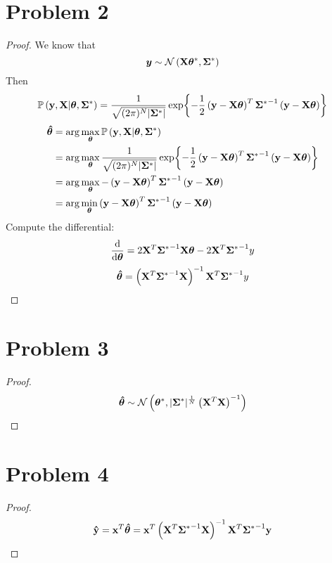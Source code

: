 \documentclass{article}
\begin{document}
\section*{Problem 2}
    \begin{proof}
    We know that $$\vb*{y}\sim \mathcal{N}\left(\vb{X}\bm{\theta}^*, \bm{\Sigma}^*\right)$$ Then
    $$ \mathbb{P}\left(\vb{y},\vb{X}|\bm{\theta},\bm{\Sigma}^*\right)
    =\frac{1}{\sqrt{(2\pi)^N |\bm{\Sigma}^*|}}\exp{-\frac{1}{2}\left(\vb{y}-\vb{X}\bm{\theta}\right)^T{\bm{\Sigma}^*}^{-1}\left(\vb{y}-\vb{X}\bm{\theta}\right)} $$
    \begin{align*}
        \bm{\hat{\theta}} &= \arg{\max_{\bm{\theta}}\mathbb{P}\left(\vb{y},\vb{X}|\bm{\theta},\bm{\Sigma}^*\right)}\\
        &=\arg{\max_{\bm{\theta}}\frac{1}{\sqrt{(2\pi)^N |\bm{\Sigma}^*|}}\exp{-\frac{1}{2}\left(\vb{y}-\vb{X}\bm{\theta}\right)^T{\bm{\Sigma}^*}^{-1}\left(\vb{y}-\vb{X}\bm{\theta}\right)}}\\
        &=\arg{\max_{\bm{\theta}}-\left(\vb{y}-\vb{X}\bm{\theta}\right)^T{\bm{\Sigma}^*}^{-1}\left(\vb{y}-\vb{X}\bm{\theta}\right)}\\
        &=\arg{\min_{\bm{\theta}}\left(\vb{y}-\vb{X}\bm{\theta}\right)^T{\bm{\Sigma}^*}^{-1}\left(\vb{y}-\vb{X}\bm{\theta}\right)}
    \end{align*}
    Compute the differential:
    $$\frac{\text{d}}{\text{d}\bm{\theta}}=2\vb{X}^T {\bm{\Sigma}^*}^{-1} \vb{X}\bm{\theta}-2\vb{X}^T {\bm{\Sigma}^*}^{-1} y$$
    $$\bm{\hat{\theta}} = \left(\vb{X}^T{\bm{\Sigma}^*}^{-1}\vb{X}\right)^{-1}\vb{X}^T {\bm{\Sigma}^*}^{-1} y$$
    \end{proof}

\section*{Problem 3}
    \begin{proof}
        $$\bm{\hat{\theta}} \sim \mathcal{N}\left(\bm{\theta}^*,|\bm{\Sigma}^*|^{\frac{1}{N}}\left(\vb{X}^T\vb{X}\right)^{-1}\right)$$
    \end{proof}

\section*{Problem 4}
    \begin{proof}
        $$\vb{\hat{y}}=\vb{x}^T\bm{\hat{\theta}}=\vb{x}^T\left(\vb{X}^T{\bm{\Sigma}^*}^{-1}\vb{X}\right)^{-1}\vb{X}^T{\bm{\Sigma}^*}^{-1}\vb{y}$$
    \end{proof}
\end{document}
